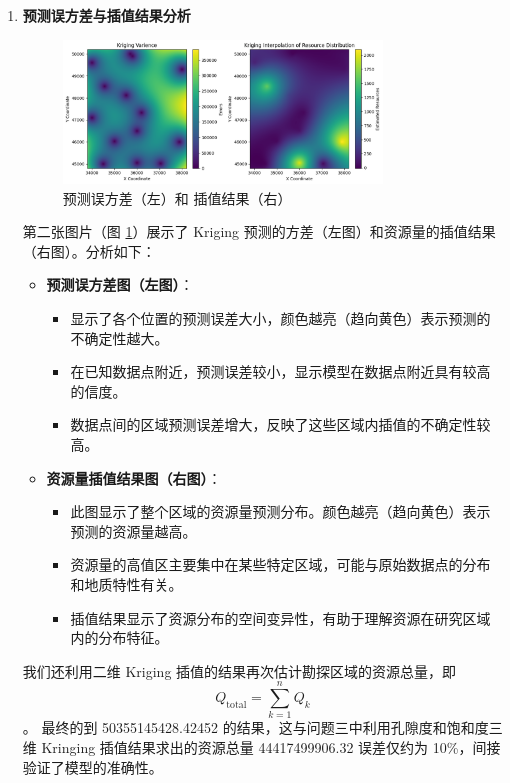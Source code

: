 \documentclass[12pt,a4paper]{nmmcm}
\begin{document}
\begin{enumerate}
  \item \textbf{预测误方差与插值结果分析} \\
        \begin{figure}[h]
          \centering
          \includegraphics[width=0.8\textwidth]{figures/task4/task4-2.png}
          \caption{预测误方差（左）和 插值结果（右）}
          \label{fig:KrigingInterpolation}
        \end{figure}
        第二张图片（图 \ref{fig:KrigingInterpolation}）展示了 Kriging 预测的方差（左图）和资源量的插值结果（右图）。分析如下：
        \begin{itemize}
          \item \textbf{预测误方差图（左图）}：
                \begin{itemize}
                  \item 显示了各个位置的预测误差大小，颜色越亮（趋向黄色）表示预测的不确定性越大。
                  \item 在已知数据点附近，预测误差较小，显示模型在数据点附近具有较高的信度。
                  \item 数据点间的区域预测误差增大，反映了这些区域内插值的不确定性较高。
                \end{itemize}
          \item \textbf{资源量插值结果图（右图）}：
                \begin{itemize}
                  \item 此图显示了整个区域的资源量预测分布。颜色越亮（趋向黄色）表示预测的资源量越高。
                  \item 资源量的高值区主要集中在某些特定区域，可能与原始数据点的分布和地质特性有关。
                  \item 插值结果显示了资源分布的空间变异性，有助于理解资源在研究区域内的分布特征。
                \end{itemize}
        \end{itemize}

        我们还利用二维 Kriging 插值的结果再次估计勘探区域的资源总量，即
        \[
          Q_{\text{total}} = \sum_{k=1}^{n} Q_k
        \]。
        最终的到 50355145428.42452 的结果，这与问题三中利用孔隙度和饱和度三维 Kringing 插值结果求出的资源总量 44417499906.32 误差仅约为 10\%，间接验证了模型的准确性。

\end{enumerate}
\end{document}
